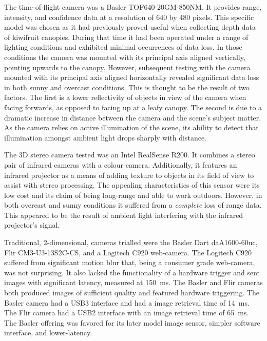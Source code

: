 \documentclass[preprint,authoryear,12pt]{elsarticle}
\begin{document}
        The time-of-flight camera was a Basler TOF640-20GM-850NM.
        It provides range, intensity, and confidence data at a resolution of 640 by 480 pixels.
        This specific model was chosen as it had previously proved useful when collecting depth data of kiwifruit canopies.
        During that time it had been operated under a range of lighting conditions and exhibited minimal occurrences of data loss.
        In those conditions the camera was mounted with its principal axis aligned vertically, pointing upwards to the canopy.
        However, subsequent testing with the camera mounted with its principal axis aligned horizontally revealed significant data loss in both sunny and overcast conditions.
        This is thought to be the result of two factors.
        The first is a lower reflectivity of objects in view of the camera when facing forwards, as opposed to facing up at a leafy canopy.
        The second is due to a dramatic increase in distance between the camera and the scene's subject matter.
        As the camera relies on active illumination of the scene, its ability to detect that illumination amongst ambient light drops sharply with distance.

        The 3D stereo camera tested was an Intel RealSense R200.
        It combines a stereo pair of infrared cameras with a colour camera.
        Additionally, it features an infrared projector as a means of adding texture to objects in its field of view to assist with stereo processing.
        The appealing characteristics of this sensor were its low cost and its claim of being long-range and able to work outdoors.
        However, in both overcast and sunny conditions it suffered from a \emph{complete} loss of range data.
        This appeared to be the result of ambient light interfering with the infrared projector’s signal.

        Traditional, 2-dimensional, cameras trialled were the Basler Dart daA1600-60uc, Flir CM3-U3-13S2C-CS, and a Logitech C920 web-camera.
        The Logitech C920 suffered from significant motion blur that, being a consumer grade web-camera, was not surprising.
        It also lacked the functionality of a hardware trigger and sent images with significant latency, measured at \SI{150}{\milli\second}.
        The Basler and Flir cameras both produced images of sufficient quality and featured hardware triggering.
        The Basler camera had a USB3 interface and had a image retrieval time of \SI{14}{\milli\second}.
        The Flir camera had a USB2 interface with an image retrieval time of \SI{65}{\milli\second}.
        The Basler offering was favored for its later model image sensor, simpler software interface, and lower-latency.
\end{document}
